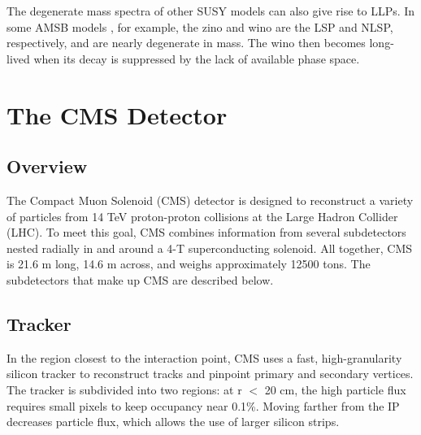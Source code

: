 \documentclass[12pt]{article}
\begin{document}
     The degenerate mass spectra of other SUSY models can also give rise to LLPs. In some AMSB models , for example, the zino and wino are the LSP and NLSP, respectively, and are nearly degenerate in mass. The wino then becomes long-lived when its decay is suppressed by the lack of available phase space. 

\section{The CMS Detector}
\subsection{Overview}
    The Compact Muon Solenoid (CMS) detector is designed to reconstruct a variety of particles from 14 TeV proton-proton collisions at the Large Hadron Collider (LHC). To meet this goal, CMS combines information from several subdetectors nested radially in and around a 4-T superconducting solenoid. All together, CMS is 21.6 m long, 14.6 m across, and weighs approximately 12500 tons. The subdetectors that make up CMS are described below.

\subsection{Tracker}
    In the region closest to the interaction point, CMS uses a fast, high-granularity silicon tracker to reconstruct tracks and pinpoint primary and secondary vertices. The tracker is subdivided into two regions: at r $<$ 20 cm, the high particle flux  requires small pixels to keep occupancy near 0.1\%. Moving farther from the IP decreases particle flux, which allows the use of larger silicon strips.
\end{document}
